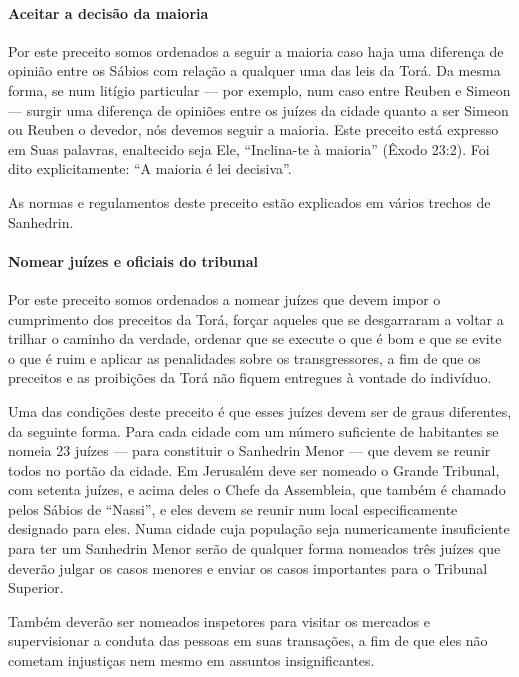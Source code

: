 \paragraph{Aceitar a decisão da maioria}

Por este preceito somos ordenados a seguir a maioria caso haja uma
diferença de opinião entre os Sábios com relação a qualquer uma das leis
da Torá. Da mesma forma, se num litígio particular --- por exemplo, num
caso entre Reuben e Simeon --- surgir uma diferença de opiniões entre os
juízes da cidade quanto a ser Simeon ou Reuben o devedor, nós devemos
seguir a maioria. Este preceito está expresso em Suas palavras,
enaltecido seja Ele, ``Inclina-te à maioria'' (Êxodo 23:2). Foi dito
explicitamente: ``A maioria é lei decisiva''.

As normas e regulamentos deste preceito estão explicados em vários
trechos de Sanhedrin.

\paragraph{Nomear juízes e oficiais do tribunal}

Por este preceito somos ordenados a nomear juízes que devem impor o
cumprimento dos preceitos da Torá, forçar aqueles que se desgarraram a
voltar a trilhar o caminho da verdade, ordenar que se execute o que é
bom e que se evite o que é ruim e aplicar as penalidades sobre os
transgressores, a fim de que os preceitos e as proibições da Torá não
fiquem entregues à vontade do indivíduo.

Uma das condições deste preceito é que esses juízes devem ser de graus
diferentes, da seguinte forma. Para cada cidade com um número
suficiente de habitantes se nomeia 23 juízes --- para constituir o
Sanhedrin Menor --- que devem se reunir todos no portão da cidade. Em
Jerusalém deve ser nomeado o Grande Tribunal, com setenta juízes, e
acima deles o Chefe da Assembleia, que também é chamado pelos Sábios de
``Nassi'', e eles devem se reunir num local especificamente designado
para eles. Numa cidade cuja população seja numericamente insuficiente
para ter um Sanhedrin Menor serão de qualquer forma nomeados três
juízes que deverão julgar os casos menores e enviar os casos importantes
para o Tribunal Superior.

Também deverão ser nomeados inspetores para visitar os mercados e
supervisionar a conduta das pessoas em suas transações, a fim de que
eles não cometam injustiças nem mesmo em assuntos insignificantes.

